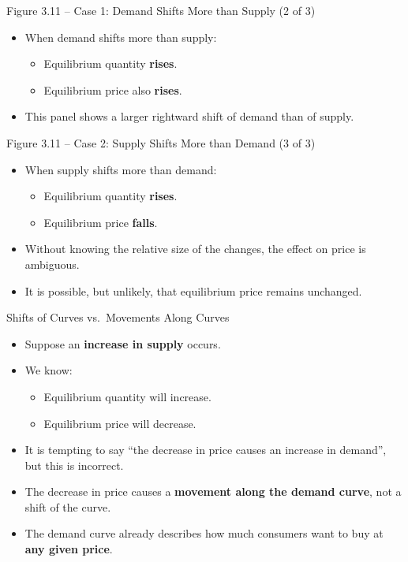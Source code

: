 \documentclass[aspectratio=169]{beamer}
\begin{document}
\begin{frame}{Figure 3.11 -- Case 1: Demand Shifts More than Supply (2 of 3)}
\transfade
\begin{itemize}
  \item When demand shifts more than supply:
  \begin{itemize}
    \item Equilibrium quantity \textbf{rises}.
    \item Equilibrium price also \textbf{rises}.
  \end{itemize}
  \item This panel shows a larger rightward shift of demand than of supply.
\end{itemize}
\end{frame}

\begin{frame}{Figure 3.11 -- Case 2: Supply Shifts More than Demand (3 of 3)}
\transfade
\begin{itemize}
  \item When supply shifts more than demand:
  \begin{itemize}
    \item Equilibrium quantity \textbf{rises}.
    \item Equilibrium price \textbf{falls}.
  \end{itemize}
  \item Without knowing the relative size of the changes, the effect on price is ambiguous.
  \item It is possible, but unlikely, that equilibrium price remains unchanged.
\end{itemize}
\end{frame}

\begin{frame}{Shifts of Curves vs.\ Movements Along Curves}
\transfade
\begin{itemize}
  \item Suppose an \textbf{increase in supply} occurs.
  \item We know:
  \begin{itemize}
    \item Equilibrium quantity will increase.
    \item Equilibrium price will decrease.
  \end{itemize}
  \item It is tempting to say ``the decrease in price causes an increase in demand'', but this is incorrect.
  \item The decrease in price causes a \textbf{movement along the demand curve}, not a shift of the curve.
  \item The demand curve already describes how much consumers want to buy at \textbf{any given price}.
\end{itemize}
\end{frame}
\end{document}
